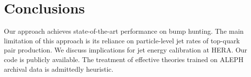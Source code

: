 \section{Conclusions}\label{sec:conclusions}

Our approach achieves state-of-the-art performance on bump hunting. The
main limitation of this approach is its reliance on particle-level jet
rates of top-quark pair production. We discuss implications for jet
energy calibration at HERA. Our code is publicly available. The
treatment of effective theories trained on ALEPH archival data is
admittedly heuristic.

